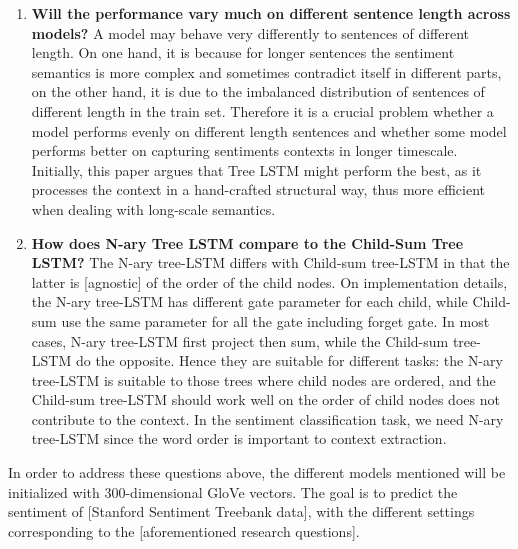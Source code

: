 \begin{enumerate}
    \item \textbf{Will the performance vary much on different sentence length across models?}
    A model may behave very differently to sentences of different length. On one
    hand, it is because for longer sentences the sentiment semantics is more
    complex and sometimes contradict itself in different parts, on the other
    hand, it is due to the imbalanced distribution of sentences of different
    length in the train set. Therefore it is a crucial problem whether a model
    performs evenly on different length sentences and whether some model
    performs better on capturing sentiments contexts in longer timescale.
    Initially, this paper argues that Tree LSTM might perform the best, as it
    processes the context in a hand-crafted structural way, thus more efficient
    when dealing with long-scale semantics.
    \item \textbf{How does N-ary Tree LSTM compare to the Child-Sum Tree LSTM?}
    The N-ary tree-LSTM differs with Child-sum tree-LSTM in that the latter is
    [agnostic] of the order of the child nodes. On implementation details, the
    N-ary tree-LSTM has different gate parameter for each child, while Child-sum
    use the same parameter for all the gate including forget gate. In most
    cases, N-ary tree-LSTM first project then sum, while the Child-sum tree-LSTM
    do the opposite. Hence they are suitable for different tasks: the N-ary
    tree-LSTM is suitable to those trees where child nodes are ordered, and the
    Child-sum tree-LSTM should work well on the order of child nodes does not
    contribute to the context. In the sentiment classification task, we need
    N-ary tree-LSTM since the word order is important to context extraction.
\end{enumerate}

In order to address these questions above, the different models mentioned will
be initialized with 300-dimensional GloVe\cite{pennington2014glove} vectors. The
goal is to predict the sentiment of [Stanford Sentiment Treebank data], with the
different settings corresponding to the [aforementioned research questions].
